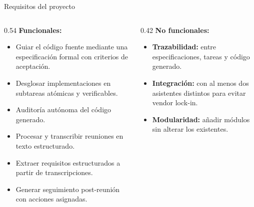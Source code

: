 \documentclass[t]{beamer}
\begin{document}
\begin{frame}{Requisitos del proyecto}
    \begin{columns}[T]
        \begin{column}{0.54\textwidth}
            \textbf{Funcionales:}
            \vspace{0.15cm}
            \begin{itemize}
                \footnotesize
                \item Guiar el código fuente mediante una especificación formal con criterios de aceptación.
                \item Desglosar implementaciones en subtareas atómicas y verificables.
                \item Auditoría autónoma del código generado.
                \item Procesar y transcribir reuniones en texto estructurado.
                \item Extraer requisitos estructurados a partir de transcripciones.
                \item Generar seguimiento post-reunión con acciones asignadas.
            \end{itemize}
        \end{column}
        \begin{column}{0.42\textwidth}
            \textbf{No funcionales:}
            \vspace{0.15cm}
            \begin{itemize}
                \footnotesize
                \item \textbf{Trazabilidad:} entre especificaciones, tareas y código generado.
                \item \textbf{Integración:} con al menos dos asistentes distintos para evitar vendor lock-in.
                \item \textbf{Modularidad:} añadir módulos sin alterar los existentes.
            \end{itemize}
        \end{column}
    \end{columns}
\end{frame}
\end{document}
